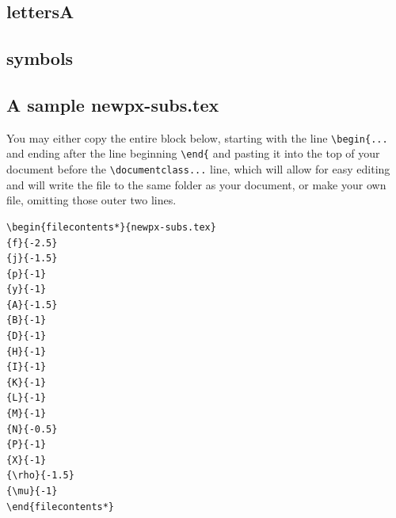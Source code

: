 \documentclass[11pt]{article}
\theoremstyle{oldplain}
\theoremstyle{plain}
\begin{document}
\subsection{lettersA}
\newpage  
\subsection{symbols}
\newpage 
\subsection{A sample newpx-subs.tex}
You may either copy the entire block below, starting with the line \verb|\begin{...| and ending after the line beginning \verb|\end{|
and pasting it into the top of your document before the \verb|\documentclass...| line, which will allow for easy editing and will write the file to the same folder as your document, or make your own file, omitting those outer two lines.

\begin{verbatim}
\begin{filecontents*}{newpx-subs.tex}
{f}{-2.5}
{j}{-1.5}
{p}{-1}
{y}{-1}
{A}{-1.5}
{B}{-1}
{D}{-1}
{H}{-1}
{I}{-1}
{K}{-1}
{L}{-1}
{M}{-1}
{N}{-0.5}
{P}{-1}
{X}{-1}
{\rho}{-1.5}
{\mu}{-1}
\end{filecontents*}
\end{verbatim}

\end{document}
